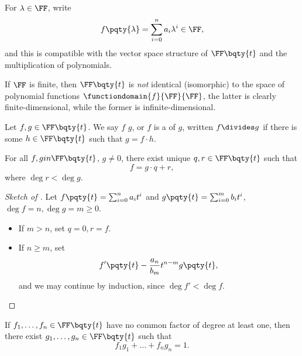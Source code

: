 \begin{definition}
    For \(\lambda \in \FF\), write
    \[
        f\pqty{\lambda} = \sum_{i = 0}^{n} a_i \lambda^i \in \FF,
    \]
    and this is compatible with the vector space structure of \(\FF\bqty{t}\) and the multiplication of polynomials.
\end{definition}

\begin{remark}
    If \(\FF\) is finite, then \(\FF\bqty{t}\) is \emph{not} identical (isomorphic) to the space of polynomial functions \(\functiondomain{f}{\FF}{\FF}\), the latter is clearly finite-dimensional, while the former is infinite-dimensional.
\end{remark}

\begin{definition}[Divisibility]
    Let \(f, g \in \FF\bqty{t}\). We say \(f\)  \(g\), or \(f\) is a  of \(g\), written \(f \divides g\) if there is some \(h \in \FF\bqty{t}\) such that \(g = f \cdot h\).
\end{definition}

\begin{proposition}
    For all \(f, g in \FF\bqty{t}\), \(g \neq 0\), there exist unique \(q, r \in \FF\bqty{t}\) such that
    \[
        f = g \cdot q + r,
    \]
    where \(\deg r < \deg g\).
\end{proposition}

\begin{proof}[Sketch of \proofname]
    Let \(f\pqty{t} = \sum_{i = 0}^{n} a_i t^i\) and \(g\pqty{t} = \sum_{i = 0}^{m} b_i t^i\), \(\deg f = n, \deg g = m \geq 0\).

    \begin{itemize}
        \item If \(m > n\), set \(q = 0, r = f\).
        \item If \(n \geq m\), set
        \[
            f'\pqty{t} - \frac{a_n}{b_m} t^{n - m} g\pqty{t},
        \]
        and we may continue by induction, since \(\deg f' < \deg f\).
    \end{itemize}
\end{proof}

\begin{corollary}
    If \(f_1, \ldots, f_n \in \FF\bqty{t}\) have no common factor of degree at least one, then there exist \(g_1, \ldots, g_n \in \FF\bqty{t}\) such that
    \[
        f_1 g_1 + \dots + f_n g_n = 1.
    \]
\end{corollary}

